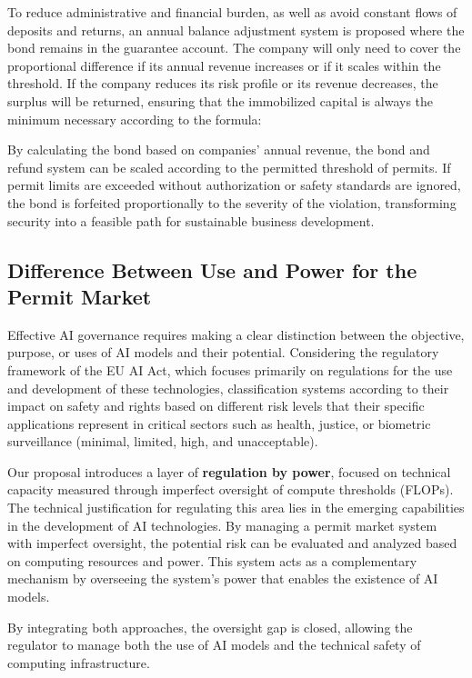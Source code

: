 To reduce administrative and financial burden, as well as avoid constant flows of deposits and returns, an annual balance adjustment system is proposed where the bond remains in the guarantee account. The company will only need to cover the proportional difference if its annual revenue increases or if it scales within the threshold. If the company reduces its risk profile or its revenue decreases, the surplus will be returned, ensuring that the immobilized capital is always the minimum necessary according to the formula:

By calculating the bond based on companies' annual revenue, the bond and refund system can be scaled according to the permitted threshold of permits. If permit limits are exceeded without authorization or safety standards are ignored, the bond is forfeited proportionally to the severity of the violation, transforming security into a feasible path for sustainable business development.

\subsection{Difference Between Use and Power for the Permit Market}

Effective AI governance requires making a clear distinction between the objective, purpose, or uses of AI models and their potential. Considering the regulatory framework of the EU AI Act, which focuses primarily on regulations for the use and development of these technologies, classification systems according to their impact on safety and rights based on different risk levels that their specific applications represent in critical sectors such as health, justice, or biometric surveillance (minimal, limited, high, and unacceptable).

Our proposal introduces a layer of \textbf{regulation by power}, focused on technical capacity measured through imperfect oversight of compute thresholds (FLOPs). The technical justification for regulating this area lies in the emerging capabilities in the development of AI technologies. By managing a permit market system with imperfect oversight, the potential risk can be evaluated and analyzed based on computing resources and power. This system acts as a complementary mechanism by overseeing the system's power that enables the existence of AI models.

By integrating both approaches, the oversight gap is closed, allowing the regulator to manage both the use of AI models and the technical safety of computing infrastructure.

